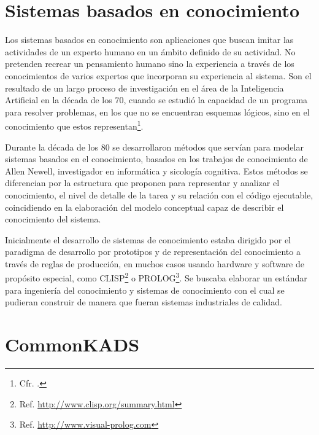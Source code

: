 
\section{Sistemas basados en conocimiento}

Los sistemas basados en conocimiento son aplicaciones que buscan imitar las actividades de un experto humano en un ámbito definido de su actividad. No pretenden recrear un pensamiento humano sino la experiencia a través de los conocimientos de varios expertos que incorporan su experiencia al sistema. Son el resultado de un largo proceso de investigación en el área de la Inteligencia Artificial en la década de los 70, cuando se estudió la capacidad de un programa para resolver problemas, en los que no se encuentran esquemas lógicos, sino en el conocimiento que estos representan\footnote{Cfr. \citealt{Labrana12}.}.

Durante la década de los 80 se desarrollaron métodos que servían para modelar sistemas basados en el conocimiento, basados en los trabajos de conocimiento de Allen Newell, investigador en informática y sicología cognitiva. Estos métodos se diferencian por la estructura que proponen para representar y analizar el conocimiento, el nivel de detalle de la tarea y su relación con el código ejecutable, coincidiendo en la elaboración del modelo conceptual capaz de describir el conocimiento del sistema.

Inicialmente el desarrollo de sistemas de conocimiento estaba dirigido por el paradigma de desarrollo por prototipos y de representación del conocimiento a través de reglas de producción, en muchos casos usando hardware y software de propósito especial, como CLISP\footnote{Ref. \url{http://www.clisp.org/summary.html}} o PROLOG\footnote{Ref. \url{http://www.visual-prolog.com}}. Se buscaba elaborar un estándar para ingeniería del conocimiento y sistemas de conocimiento con el cual se pudieran construir de manera que fueran sistemas industriales de calidad.



\section{CommonKADS}

